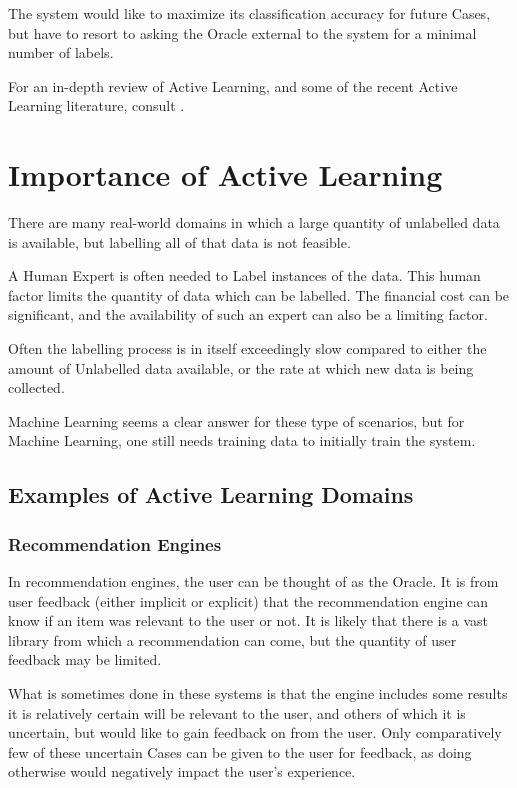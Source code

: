 \documentclass[a4paper,11pt]{report}
\begin{document}
The system would like to maximize its classification accuracy for future Cases, but have to resort to asking the Oracle external to the system for a minimal number of labels.

For an in-depth review of Active Learning, and some of the recent Active Learning literature, consult \citet{Settles2010}.

\section{Importance of Active Learning}
There are many real-world domains in which a large quantity of unlabelled data is available, but labelling all of that data is not feasible. 

A Human Expert is often needed to Label instances of the data. This human factor limits the quantity of data which can be labelled. The financial cost can be significant, and the availability of such an expert can also be a limiting factor.

Often the labelling process is in itself exceedingly slow compared to either the amount of Unlabelled data available, or the rate at which new data is being collected. 

Machine Learning seems a clear answer for these type of scenarios, but for Machine Learning, one still needs training data to initially train the system.

\subsection{Examples of Active Learning Domains}
\subsubsection{Recommendation Engines}
In recommendation engines, the user can be thought of as the Oracle. It is from user feedback (either implicit or explicit) that the recommendation engine can know if an item was relevant to the user or not. It is likely that there is a vast library from which a recommendation can come, but the quantity of user feedback may be limited.

What is sometimes done in these systems is that the engine includes some results it is relatively certain will be relevant to the user, and others of which it is uncertain, but would like to gain feedback on from the user. Only comparatively few of these uncertain Cases can be given to the user for feedback, as doing otherwise would negatively impact the user's experience.
\end{document}

